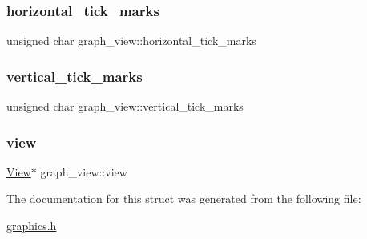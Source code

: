 \subsubsection{\texorpdfstring{horizontal\+\_\+tick\+\_\+marks}{horizontal\_tick\_marks}}
{\footnotesize\ttfamily unsigned char graph\+\_\+view\+::horizontal\+\_\+tick\+\_\+marks}

\mbox{\label{structgraph__view_aea851ba75c3cf634c25aa11fcb08299c}} 
\subsubsection{\texorpdfstring{vertical\+\_\+tick\+\_\+marks}{vertical\_tick\_marks}}
{\footnotesize\ttfamily unsigned char graph\+\_\+view\+::vertical\+\_\+tick\+\_\+marks}

\mbox{\label{structgraph__view_a44e9bb5000071005cad8bf8fe330ad45}} 
\subsubsection{\texorpdfstring{view}{view}}
{\footnotesize\ttfamily \hyperlink{structView}{View}$\ast$ graph\+\_\+view\+::view}



The documentation for this struct was generated from the following file\+:\begin{DoxyCompactItemize}
\item 
\hyperlink{graphics_8h}{graphics.\+h}\end{DoxyCompactItemize}
